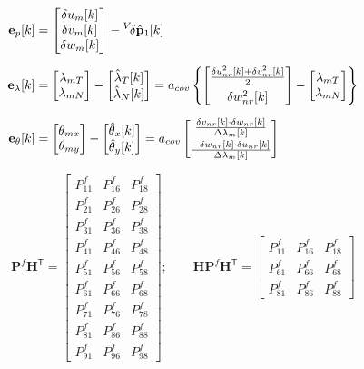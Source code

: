 \documentclass[UTF8,11pt,a4paper]{ctexart}
\newcommand{\tp}{^{\!\mathsf{T}}}
\newcommand{\thhat}[1]{\hat{\theta}_{#1}[k]}    %
\newcommand{\lamhat}[1]{\hat{\lambda}_{#1}[k]}   %
\begin{document}
\begin{align}
\mathbf{e}_p[k]
&= \begin{bmatrix}\delta u_m[k]\\\delta v_m[k]\\\delta w_m[k]\end{bmatrix}
- {}^V\!\delta\hat{\mathbf{p}}_1[k] \notag\\[6pt]
\mathbf{e}_\lambda[k]
&= \begin{bmatrix}\lambda_{mT}\\\lambda_{mN}\end{bmatrix}
- \begin{bmatrix}\lamhat{T}\\\lamhat{N}\end{bmatrix}
= a_{cov}\left\{
\begin{bmatrix}
\frac{\delta u_{nr}^2[k]+\delta v_{nr}^2[k]}{2}\\[4pt]
\delta w_{nr}^2[k]
\end{bmatrix}
- \begin{bmatrix}\lambda_{mT}\\\lambda_{mN}\end{bmatrix}
\right\} \notag\\[6pt]
\mathbf{e}_\theta[k]
&= \begin{bmatrix}\theta_{mx}\\\theta_{my}\end{bmatrix}
- \begin{bmatrix}\thhat{x}\\\thhat{y}\end{bmatrix}
= a_{cov}\begin{bmatrix}
\frac{\delta v_{nr}[k]\cdot\delta w_{nr}[k]}{\Delta\lambda_m[k]}\\[4pt]
\frac{-\delta w_{nr}[k]\cdot\delta u_{nr}[k]}{\Delta\lambda_m[k]}
\end{bmatrix} \notag
\end{align}


\[
\mathbf{P}^f\mathbf{H}\tp
= \begin{bmatrix}
P_{11}^f & P_{16}^f & P_{18}^f\\
P_{21}^f & P_{26}^f & P_{28}^f\\
P_{31}^f & P_{36}^f & P_{38}^f\\
P_{41}^f & P_{46}^f & P_{48}^f\\
P_{51}^f & P_{56}^f & P_{58}^f\\
P_{61}^f & P_{66}^f & P_{68}^f\\
P_{71}^f & P_{76}^f & P_{78}^f\\
P_{81}^f & P_{86}^f & P_{88}^f\\
P_{91}^f & P_{96}^f & P_{98}^f
\end{bmatrix};\qquad
\mathbf{H}\mathbf{P}^f\mathbf{H}\tp
= \begin{bmatrix}
P_{11}^f & P_{16}^f & P_{18}^f\\
P_{61}^f & P_{66}^f & P_{68}^f\\
P_{81}^f & P_{86}^f & P_{88}^f
\end{bmatrix}
\]
\end{document}
